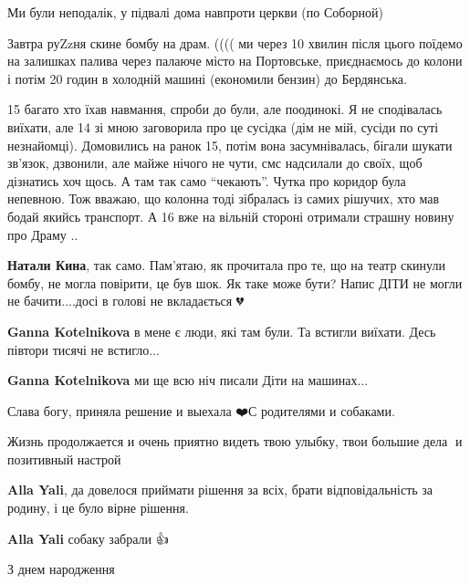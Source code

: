 
Ми були неподалік, у підвалі дома навпроти церкви (по Соборной)

Завтра руZzня скине бомбу на драм. (((( ми через 10 хвилин після цього поїдемо
на залишках палива через палаюче місто на Портовське, приєднаємось до колони і
потім 20 годин в холодній машині (економили бензин) до Бердянська.


15 багато хто їхав навмання, спроби до були, але поодинокі. Я не сподівалась
виїхати, але 14 зі мною заговорила про це сусідка (дім не мій, сусіди по суті
незнайомці). Домовились на ранок 15, потім вона засумнівалась, бігали шукати
зв'язок, дзвонили, але майже нічого не чути, смс надсилали до своїх, щоб
дізнатись хоч щось. А там так само \enquote{чекають}. Чутка про коридор була непевною.
Тож вважаю, що колонна тоді зібралась із самих рішучих, хто мав бодай якийсь
транспорт. А 16 вже на вільній стороні отримали страшну новину про Драму ..

\begin{itemize} %
\textbf{Натали Кина}, так само. Пам'ятаю, як прочитала про те, що на театр скинули бомбу, не могла повірити, це був шок. Як таке може бути? Напис ДІТИ не могли не бачити....досі в голові не вкладається 💔

\textbf{Ganna Kotelnikova} в мене є люди, які там були. Та встигли виїхати. Десь півтори тисячі не встигло...

\textbf{Ganna Kotelnikova} ми ще всю ніч писали Діти на машинах...
\end{itemize} %


Слава богу, приняла решение и выехала ❤️С родителями и собаками.

Жизнь продолжается и очень приятно видеть твою улыбку, твои большие дела💪 и позитивный настрой 🫠

\begin{itemize} %
\textbf{Alla Yali}, да довелося приймати рішення за всіх, брати відповідальність за родину, і це було вірне рішення.

\textbf{Alla Yali} собаку забрали 👍
\end{itemize} %


З днем народження

